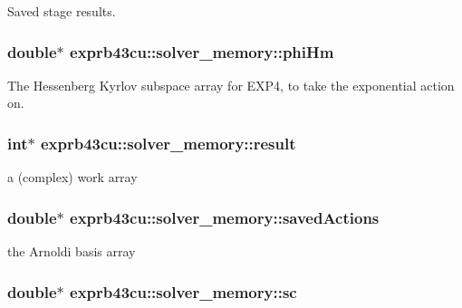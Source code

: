 Saved stage results. 

\subsubsection[{\texorpdfstring{phi\+Hm}{phiHm}}]{\setlength{\rightskip}{0pt plus 5cm}double$\ast$ exprb43cu\+::solver\+\_\+memory\+::phi\+Hm}\hypertarget{structexprb43cu_1_1solver__memory_aebb83d142ab8d04edad3538544c67ec4}{}\label{structexprb43cu_1_1solver__memory_aebb83d142ab8d04edad3538544c67ec4}


The Hessenberg Kyrlov subspace array for E\+X\+P4, to take the exponential action on. 

\subsubsection[{\texorpdfstring{result}{result}}]{\setlength{\rightskip}{0pt plus 5cm}int$\ast$ exprb43cu\+::solver\+\_\+memory\+::result}\hypertarget{structexprb43cu_1_1solver__memory_a69d7ae536d679306d284b461a8bdb2c3}{}\label{structexprb43cu_1_1solver__memory_a69d7ae536d679306d284b461a8bdb2c3}


a (complex) work array 

\subsubsection[{\texorpdfstring{saved\+Actions}{savedActions}}]{\setlength{\rightskip}{0pt plus 5cm}double$\ast$ exprb43cu\+::solver\+\_\+memory\+::saved\+Actions}\hypertarget{structexprb43cu_1_1solver__memory_aee268d381ce2f3ab02754793dfd068ee}{}\label{structexprb43cu_1_1solver__memory_aee268d381ce2f3ab02754793dfd068ee}


the Arnoldi basis array 

\subsubsection[{\texorpdfstring{sc}{sc}}]{\setlength{\rightskip}{0pt plus 5cm}double$\ast$ exprb43cu\+::solver\+\_\+memory\+::sc}\hypertarget{structexprb43cu_1_1solver__memory_aff9b454c8a0c5ecef261b359c44db926}{}\label{structexprb43cu_1_1solver__memory_aff9b454c8a0c5ecef261b359c44db926}
